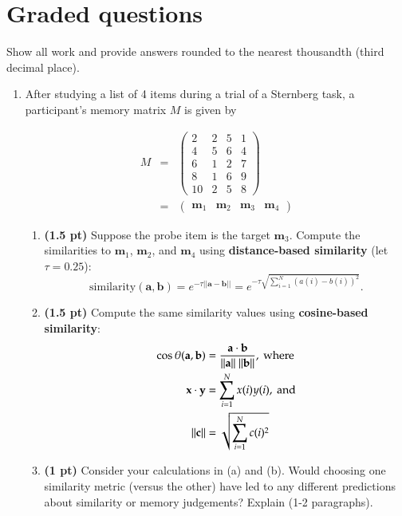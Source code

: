 \documentclass[11pt]{article}
\begin{document}
\section*{Graded questions}
Show all work and provide answers rounded to the nearest thousandth (third
decimal place).
\begin{enumerate}
\item After studying a list of 4 items during a trial of a Sternberg
  task, a participant's memory matrix $M$ is given by

\begin{eqnarray*}
M&=&
\left( 
\begin{array}{cccc}
2 & 2 & 5 & 1\\
4 & 5 & 6 & 4\\
6 & 1 & 2 & 7\\
8 & 1 & 6 & 9\\
10 & 2 & 5 & 8
\end{array} 
\right) \\
&=&
\left( 
\begin{array}{cccc}
\mathbf{m}_1 & \mathbf{m}_2 & \mathbf{m}_3 & \mathbf{m}_4  
 \end{array} 
\right) \nonumber
\end{eqnarray*}
\begin{enumerate}
\item \textbf{(1.5 pt)} Suppose the probe item is the target $\mathbf{m}_3$.  Compute
  the similarities to $\mathbf{m}_1$, $\mathbf{m}_2$, and
  $\mathbf{m}_4$ using \textbf{distance-based similarity} (let $\tau =
  0.25$):
\[
\mathrm{similarity}(\mathbf{a}, \mathbf{b}) = e^{-\tau||\mathbf{a} -
  \mathbf{b}||} = e^{-\tau\sqrt{\sum_{i=1}^N(a(i) - b(i))^2}}.
\]
\item \textbf{(1.5 pt)}  Compute the same similarity values using
  \textbf{cosine-based similarity}:
\begin{align}
\cos\theta(\mathbf{a}, \mathbf{b}) &=
\frac{\mathbf{a}\cdot\mathbf{b}}{||\mathbf{a}||~||\mathbf{b}||},~\mathrm{where}\notag\\
\mathbf{x}\cdot\mathbf{y} &= \sum_{i=1}^N x(i)y(i),~\mathrm{and}\notag\\
||\mathbf{c}|| &= \sqrt{\sum_{i=1}^N c(i)^2}\notag\\
\end{align}

\item \textbf{(1 pt)} Consider your calculations in (a) and (b).  Would
  choosing one similarity metric (versus the other) have led to any
  different predictions about similarity or memory judgements?
  Explain (1-2 paragraphs).


\end{enumerate}
\end{enumerate}
\end{document}
